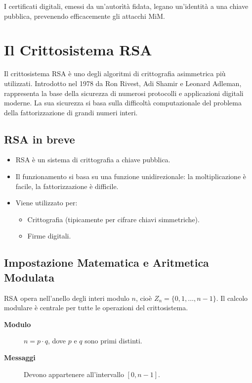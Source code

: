 \documentclass{report}
\begin{document}
I certificati digitali, emessi da un'autor\`it\`a fidata, legano un'identit\`a a una chiave pubblica, prevenendo efficacemente gli attacchi MiM.

\section{Il Crittosistema RSA}

Il crittosistema RSA \`e uno degli algoritmi di crittografia asimmetrica pi\`u utilizzati. Introdotto nel 1978 da Ron Rivest, Adi Shamir e Leonard Adleman, rappresenta la base della sicurezza di numerosi protocolli e applicazioni digitali moderne. La sua sicurezza si basa sulla difficolt\`a computazionale del problema della fattorizzazione di grandi numeri interi.

\subsection{RSA in breve}
\begin{itemize}
  \item RSA \`e un sistema di crittografia a chiave pubblica.
  \item Il funzionamento si basa su una funzione unidirezionale: la moltiplicazione \`e facile, la fattorizzazione \`e difficile.
  \item Viene utilizzato per:
  \begin{itemize}
    \item Crittografia (tipicamente per cifrare chiavi simmetriche).
    \item Firme digitali.
  \end{itemize}
\end{itemize}

\subsection{Impostazione Matematica e Aritmetica Modulata}
RSA opera nell'anello degli interi modulo $n$, cio\`e $Z_{n} = \{0, 1, \ldots, n-1\}$. Il calcolo modulare \`e centrale per tutte le operazioni del crittosistema.

\begin{description}
  \item[\textbf{Modulo}] $n = p \cdot q$, dove $p$ e $q$ sono primi distinti.
  \item[\textbf{Messaggi}] Devono appartenere all'intervallo $[0, n-1]$.
\end{description}
\end{document}
